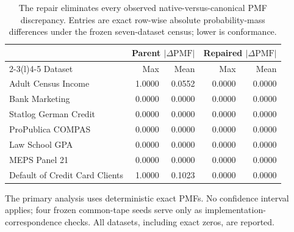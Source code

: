 \begin{table}[H]
\centering
\caption{The repair eliminates every observed native-versus-canonical PMF discrepancy. Entries are exact row-wise absolute probability-mass differences under the frozen seven-dataset census; lower is conformance.}
\label{tab:fairlearn-v2-results}
\small
\begin{tabular}{@{}lrrrr@{}}
\toprule
& \multicolumn{2}{c}{Parent $|\Delta\mathrm{PMF}|$} & \multicolumn{2}{c}{Repaired $|\Delta\mathrm{PMF}|$} \\
\cmidrule(lr){2-3}\cmidrule(l){4-5}
Dataset & Max & Mean & Max & Mean \\
\midrule
Adult Census Income & 1.0000 & 0.0552 & 0.0000 & 0.0000 \\
Bank Marketing & 0.0000 & 0.0000 & 0.0000 & 0.0000 \\
Statlog German Credit & 0.0000 & 0.0000 & 0.0000 & 0.0000 \\
ProPublica COMPAS & 0.0000 & 0.0000 & 0.0000 & 0.0000 \\
Law School GPA & 0.0000 & 0.0000 & 0.0000 & 0.0000 \\
MEPS Panel 21 & 0.0000 & 0.0000 & 0.0000 & 0.0000 \\
Default of Credit Card Clients & 1.0000 & 0.1023 & 0.0000 & 0.0000 \\
\bottomrule
\end{tabular}
\vspace{2pt}
\begin{minipage}{0.98\linewidth}\footnotesize
The primary analysis uses deterministic exact PMFs. No confidence interval applies; four frozen common-tape seeds serve only as implementation-correspondence checks. All datasets, including exact zeros, are reported.
\end{minipage}
\end{table}
